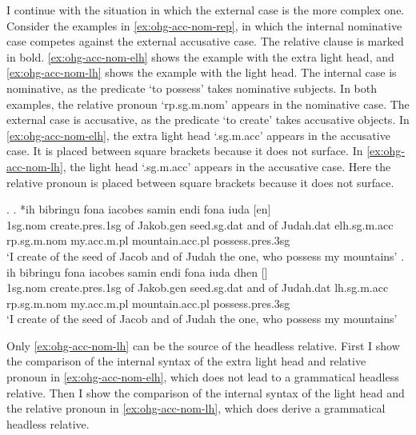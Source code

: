 I continue with the situation in which the external case is the more complex one.
Consider the examples in \ref{ex:ohg-acc-nom-rep}, in which the internal nominative case competes against the external accusative case. The relative clause is marked in bold. \ref{ex:ohg-acc-nom-elh} shows the example with the extra light head, and \ref{ex:ohg-acc-nom-lh} shows the example with the light head.
The internal case is nominative, as the predicate  `to possess' takes nominative subjects.
In both examples, the relative pronoun  `\ac{rp}.\ac{sg}.\ac{m}.\ac{nom}' appears in the nominative case.
The external case is accusative, as the predicate  `to create' takes accusative objects.
In \ref{ex:ohg-acc-nom-elh}, the extra light head  `.\ac{sg}.\ac{m}.\ac{acc}' appears in the accusative case. It is placed between square brackets because it does not surface.
In \ref{ex:ohg-acc-nom-lh}, the light head  `.\ac{sg}.\ac{m}.\ac{acc}' appears in the accusative case. Here the relative pronoun is placed between square brackets because it does not surface.

\ex.\label{ex:ohg-acc-nom-rep}
\ag. *ih bibringu fona iacobes samin endi fona iuda [en]    \\
1\ac{sg}.\ac{nom} {create}.\ac{pres}.1\ac{sg}\scsub{[acc]} of Jakob.\ac{gen} seed.\ac{sg}.\ac{dat} and of Judah.\ac{dat} \ac{elh}.\ac{sg}.\ac{m}.\ac{acc} \ac{rp}.\ac{sg}.\ac{m}.\ac{nom} my.\ac{acc}.\ac{m}.\ac{pl} mountain.\ac{acc}.\ac{pl} possess.\ac{pres}.3\ac{sg}\scsub{[nom]}\\
`I create of the seed of Jacob and of Judah the one, who possess my mountains' \label{ex:ohg-acc-nom-elh}
\bg. ih bibringu fona iacobes samin endi fona iuda dhen []   \\
1\ac{sg}.\ac{nom} {create}.\ac{pres}.1\ac{sg}\scsub{[acc]} of Jakob.\ac{gen} seed.\ac{sg}.\ac{dat} and of Judah.\ac{dat} \ac{lh}.\ac{sg}.\ac{m}.\ac{acc} \ac{rp}.\ac{sg}.\ac{m}.\ac{nom} my.\ac{acc}.\ac{m}.\ac{pl} mountain.\ac{acc}.\ac{pl} possess.\ac{pres}.3\ac{sg}\scsub{[nom]}\\
`I create of the seed of Jacob and of Judah the one, who possess my mountains' \label{ex:ohg-acc-nom-lh}

Only \ref{ex:ohg-acc-nom-lh} can be the source of the headless relative. First I show the comparison of the internal syntax of the extra light head and relative pronoun in \ref{ex:ohg-acc-nom-elh}, which does not lead to a grammatical headless relative. Then I show the comparison of the internal syntax of the light head and the relative pronoun in \ref{ex:ohg-acc-nom-lh}, which does derive a grammatical headless relative.

